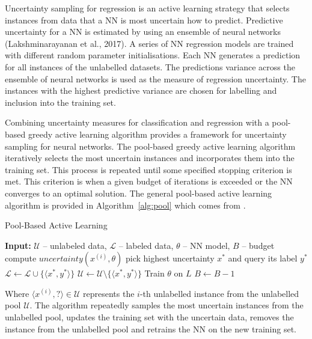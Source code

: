 \documentclass[conference]{IEEEtran}
\begin{document}
	Uncertainty sampling for regression is an active learning strategy that selects instances from data that a NN is most uncertain how to predict. Predictive uncertainty for a NN is estimated by using an ensemble of neural networks (Lakshminarayanan et al., 2017). A series of NN regression models are trained with different random parameter initialisations. Each NN generates a prediction for all instances of the unlabelled datasets. The predictions variance across the ensemble of neural networks is used as the measure of regression uncertainty. The instances with the highest predictive variance are chosen for labelling and inclusion into the training set.
	
	Combining uncertainty measures for classification and regression with a pool-based greedy active learning algorithm provides a framework for uncertainty sampling for neural networks. The pool-based greedy active learning algorithm iteratively selects the most uncertain instances and incorporates them into the training set. This process is repeated until some specified stopping criterion is met. This criterion is when a given budget of iterations is exceeded or the NN converges to an optimal solution. The general pool-based active learning algorithm is provided in Algorithm~\ref{alg:pool} which comes from \cite{sharma2017}.
	
	\begin{algorithm}[H]
		\caption{Pool-Based Active Learning}
		\label{alg:pool}
		\begin{algorithmic}[1]
			\State\textbf{Input:} $\mathcal{U}$ -- unlabeled data, $\mathcal{L}$ -- labeled data, $\theta$ -- NN model, $B$ -- budget
			\Repeat
			\State compute $uncertainty(x^{(i)}, \theta)$
			\EndFor
			\State pick highest uncertainty $x^{*}$ and query its label $y^{*}$
			\State $\mathcal{L} \gets \mathcal{L} \cup \{\langle x^{*}, y^{*}\rangle\}$
			\State $\mathcal{U} \gets \mathcal{U} \setminus \{\langle x^{*}, y^{*}\rangle\}$
			\State Train $\theta$ on $L$
			\State $B \gets B - 1$
		\end{algorithmic}
	\end{algorithm}
	
	Where $\langle x^{(i)}, ? \rangle \in \mathcal{U}$ represents the $i$-th unlabelled instance from the unlabelled pool $\mathcal{U}$. The algorithm repeatedly samples the most uncertain instances from the unlabelled pool, updates the training set with the uncertain data, removes the instance from the unlabelled pool and retrains the NN on the new training set.
	
\end{document}
